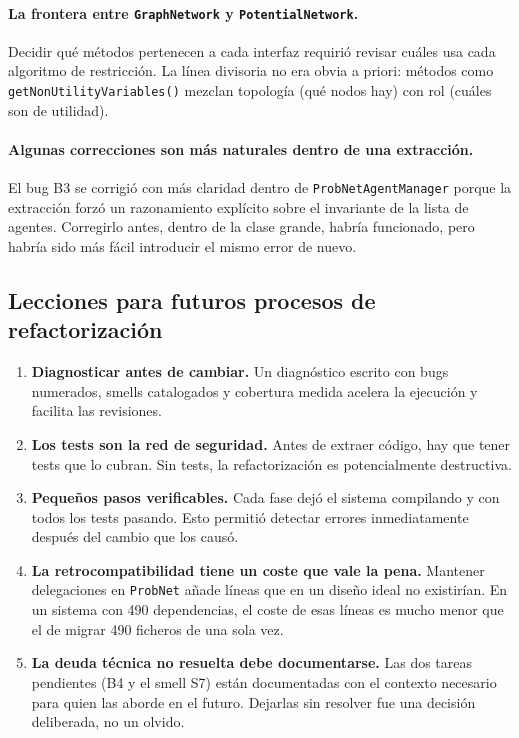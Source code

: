\documentclass[11pt,a4paper]{article}
\newcommand{\code}[1]{\texttt{#1}}
\begin{document}
\paragraph{La frontera entre \code{GraphNetwork} y \code{PotentialNetwork}.}
Decidir qué métodos pertenecen a cada interfaz requirió revisar cuáles usa
cada algoritmo de restricción.  La línea divisoria no era obvia a priori:
métodos como \code{getNonUtilityVariables()} mezclan topología (qué nodos
hay) con rol (cuáles son de utilidad).

\paragraph{Algunas correcciones son más naturales dentro de una extracción.}
El bug B3 se corrigió con más claridad dentro de \code{ProbNetAgentManager}
porque la extracción forzó un razonamiento explícito sobre el invariante de
la lista de agentes.  Corregirlo antes, dentro de la clase grande, habría
funcionado, pero habría sido más fácil introducir el mismo error de nuevo.

\subsection{Lecciones para futuros procesos de refactorización}

\begin{enumerate}
  \item \textbf{Diagnosticar antes de cambiar.}  Un diagnóstico escrito
        con bugs numerados, smells catalogados y cobertura medida acelera
        la ejecución y facilita las revisiones.

  \item \textbf{Los tests son la red de seguridad.}  Antes de extraer
        código, hay que tener tests que lo cubran.  Sin tests, la
        refactorización es potencialmente destructiva.

  \item \textbf{Pequeños pasos verificables.}  Cada fase dejó el sistema
        compilando y con todos los tests pasando.  Esto permitió detectar
        errores inmediatamente después del cambio que los causó.

  \item \textbf{La retrocompatibilidad tiene un coste que vale la pena.}
        Mantener delegaciones en \code{ProbNet} añade líneas que en un
        diseño ideal no existirían.  En un sistema con 490 dependencias,
        el coste de esas líneas es mucho menor que el de migrar 490
        ficheros de una sola vez.

  \item \textbf{La deuda técnica no resuelta debe documentarse.}  Las
        dos tareas pendientes (B4 y el smell S7) están documentadas con el
        contexto necesario para quien las aborde en el futuro.  Dejarlas
        sin resolver fue una decisión deliberada, no un olvido.
\end{enumerate}
\end{document}
